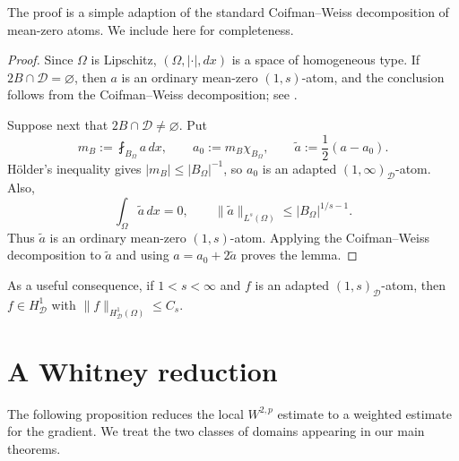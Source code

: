 \documentclass[12pt]{amsart}
\numberwithin{equation}{section}
\newcommand\cD{\mathcal{D}}
\newcommand\dist{\operatorname{dist}}
\newcommand{\p}{\partial}
\begin{document}
The proof is a simple adaption of the standard Coifman--Weiss decomposition of mean-zero atoms. We include here for completeness.

\begin{proof}
Since $\Omega$ is Lipschitz, $(\Omega,|\cdot|,dx)$ is a space of
homogeneous type.  If $2B\cap\cD=\varnothing$, then $a$ is an ordinary
mean-zero $(1,s)$-atom, and the conclusion follows from the
Coifman--Weiss decomposition; see \cite[Theorem~A]{MR447954}.

Suppose next that $2B\cap\cD\neq\varnothing$.  Put
\[
 m_B:=\fint_{B_\Omega}a\,dx,
 \qquad
 a_0:=m_B\chi_{B_\Omega},
 \qquad
 \widetilde a:=\frac12(a-a_0).
\]
H\"older's inequality gives $|m_B|\leq|B_\Omega|^{-1}$, so $a_0$ is
an adapted $(1,\infty)_{\cD}$-atom.  Also,
\[
 \int_\Omega\widetilde a\,dx=0,
 \qquad
 \|\widetilde a\|_{L^s(\Omega)}
 \leq |B_\Omega|^{1/s-1}.
\]
Thus $\widetilde a$ is an ordinary mean-zero $(1,s)$-atom.  Applying
the Coifman--Weiss decomposition to $\widetilde a$ and using
$a=a_0+2\widetilde a$ proves the lemma.
\end{proof}

As a useful consequence, if $1<s<\infty$ and $f$ is an adapted $(1,s)_\cD$-atom, then $f \in H^1_\cD$ with
$\|f\|_{H^1_\cD (\Omega)} \leq C_s$.


\section{A Whitney reduction}
\label{sec-whitney}

The following proposition reduces the local $W^{2,p}$ estimate to
a weighted estimate for the gradient. We treat the two classes of
domains appearing in our main theorems.


\end{document}
